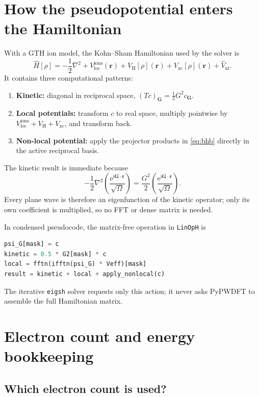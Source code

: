 \documentclass[10pt,twocolumn]{article}
\newcommand{\ii}{\mathrm{i}}
\newcommand{\e}{\mathrm{e}}
\newcommand{\vnl}{\widehat V_{\mathrm{nl}}}
\newcommand{\gvec}{\mathbf G}
\newcommand{\rvec}{\mathbf r}
\newcommand{\code}[1]{\texttt{#1}}
\begin{document}
\section{How the pseudopotential enters the Hamiltonian}

With a GTH ion model, the Kohn--Sham Hamiltonian used by the solver is
\begin{equation}
\widehat H[\rho]
=-\frac12\nabla^2
+V_{\mathrm{loc}}^{\mathrm{ions}}(\rvec)
+V_{\mathrm H}[\rho](\rvec)
+V_{\mathrm{xc}}[\rho](\rvec)
+\vnl.
\label{eq:ks-psp}
\end{equation}
It contains three computational patterns:
\begin{enumerate}
  \item \textbf{Kinetic:} diagonal in reciprocal space,
  \((Tc)_{\gvec}=\tfrac12G^2c_{\gvec}\).
  \item \textbf{Local potentials:} transform \(c\) to real space, multiply
  pointwise by \(V_{\mathrm{loc}}^{\mathrm{ions}}+V_{\mathrm H}
  +V_{\mathrm{xc}}\), and transform back.
  \item \textbf{Non-local potential:} apply the projector products in
  \cref{eq:bhb} directly in the active reciprocal basis.
\end{enumerate}
The kinetic result is immediate because
\begin{equation}
-\frac12\nabla^2
\left(\frac{\e^{\ii\gvec\cdot\rvec}}{\sqrt\Omega}\right)
=\frac{G^2}{2}
\left(\frac{\e^{\ii\gvec\cdot\rvec}}{\sqrt\Omega}\right).
\end{equation}
Every plane wave is therefore an eigenfunction of the kinetic operator; only
its own coefficient is multiplied, so no FFT or dense matrix is needed.

In condensed pseudocode, the matrix-free operation in \code{LinOpH} is
\begin{lstlisting}[language=Python]
psi_G[mask] = c
kinetic = 0.5 * G2[mask] * c
local = fftn(ifftn(psi_G) * Veff)[mask]
result = kinetic + local + apply_nonlocal(c)
\end{lstlisting}
The iterative \code{eigsh} solver requests only this action; it never asks
PyPWDFT to assemble the full Hamiltonian matrix.

\section{Electron count and energy bookkeeping}

\subsection{Which electron count is used?}
\end{document}
